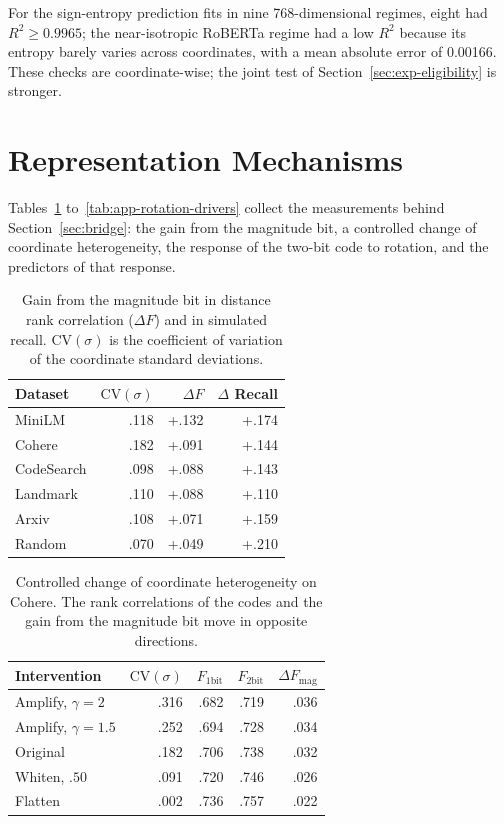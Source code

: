 For the sign-entropy prediction fits in nine 768-dimensional regimes, eight had $R^2\ge0.9965$; the near-isotropic RoBERTa regime had a low $R^2$ because its entropy barely varies across coordinates, with a mean absolute error of 0.00166. These checks are coordinate-wise; the joint test of Section~\ref{sec:exp-eligibility} is stronger.

\section{Representation Mechanisms}
\label{app:mechanisms}

Tables~\ref{tab:app-magnitude} to~\ref{tab:app-rotation-drivers} collect the measurements behind Section~\ref{sec:bridge}: the gain from the magnitude bit, a controlled change of coordinate heterogeneity, the response of the two-bit code to rotation, and the predictors of that response.

\begin{table}[tbp]
\centering


\small
\begin{tabular}{lrrr}
\toprule
Dataset & $\mathrm{CV}(\sigma)$ & $\Delta F$ & $\Delta$ Recall \\
\midrule
MiniLM & .118 & +.132 & +.174 \\
Cohere & .182 & +.091 & +.144 \\
CodeSearch & .098 & +.088 & +.143 \\
Landmark & .110 & +.088 & +.110 \\
Arxiv & .108 & +.071 & +.159 \\
Random & .070 & +.049 & +.210 \\
\bottomrule
\end{tabular}

\small
\caption{Gain from the magnitude bit in distance rank correlation ($\Delta F$) and in simulated recall. $\mathrm{CV}(\sigma)$ is the coefficient of variation of the coordinate standard deviations.}
\label{tab:app-magnitude}
\end{table}

\begin{table}[tbp]
\centering


\small
\begin{tabular}{lrrrr}
\toprule
Intervention & $\mathrm{CV}(\sigma)$ & $F_{1\mathrm{bit}}$ & $F_{2\mathrm{bit}}$ & $\Delta F_{\mathrm{mag}}$ \\
\midrule
Amplify, $\gamma=2$ & .316 & .682 & .719 & .036 \\
Amplify, $\gamma=1.5$ & .252 & .694 & .728 & .034 \\
Original & .182 & .706 & .738 & .032 \\
Whiten, $.50$ & .091 & .720 & .746 & .026 \\
Flatten & .002 & .736 & .757 & .022 \\
\bottomrule
\end{tabular}

\small
\caption{Controlled change of coordinate heterogeneity on Cohere. The rank correlations of the codes and the gain from the magnitude bit move in opposite directions.}
\label{tab:app-intervention}
\end{table}

